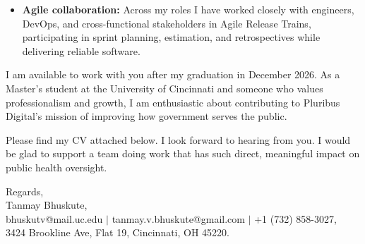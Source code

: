 \documentclass[11pt]{letter}
\begin{document}
\begin{letter}{}
\begin{itemize}[leftmargin=*, itemsep=0.45em]
    \item \textbf{Agile collaboration:} Across my roles I have worked closely with engineers, DevOps, and cross-functional stakeholders in Agile Release Trains, participating in sprint planning, estimation, and retrospectives while delivering reliable software.
\end{itemize}

I am available to work with you after my graduation in December 2026. As a Master's student at the University of Cincinnati and someone who values professionalism and growth, I am enthusiastic about contributing to Pluribus Digital's mission of improving how government serves the public.

Please find my CV attached below. I look forward to hearing from you. I would be glad to support a team doing work that has such direct, meaningful impact on public health oversight.

{\setlength{\parskip}{0pt}
Regards,\\
Tanmay Bhuskute,\\
bhuskutv@mail.uc.edu $\mid$ tanmay.v.bhuskute@gmail.com $\mid$ +1 (732) 858-3027,\\
3424 Brookline Ave, Flat 19, Cincinnati, OH 45220.
}

\end{letter}
\end{document}
